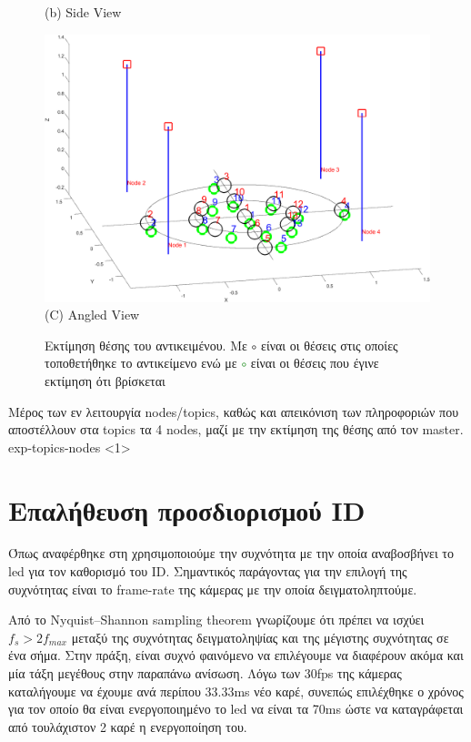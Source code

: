 \begin{figure} [H]
\begin{minipage}{.5\textwidth}
      {(b) Side View}
	  \end{minipage}
  \begin{minipage}{\textwidth}
    \centering
    \includegraphics[width=.8\linewidth]{../Images/Experiments-Results/nodes-pos-with-est-angle.png}\\
    {(C) Angled View}
  \end{minipage}
    \hfill \break
    \decoRule
    \caption[Εκτίμηση θέσης του αντικειμένου.]{Εκτίμηση θέσης του αντικειμένου. Με \textcolor{black}{\LARGE$\circ$} είναι οι θέσεις στις οποίες τοποθετήθηκε το αντικείμενο ενώ με \textcolor{green}{\LARGE$\circ$} είναι οι θέσεις που έγινε εκτίμηση ότι βρίσκεται} %
    \label{fig:multi-exp-pos-estimations}
\end{figure}

{Μέρος των εν λειτουργία nodes/topics, καθώς και απεικόνιση των πληροφοριών που αποστέλλουν στα topics τα 4 nodes, μαζί με την εκτίμηση της θέσης από τον master.}%
{exp-topics-nodes}%
<1>

\section{Επαλήθευση προσδιορισμού ID}
Όπως αναφέρθηκε στη  χρησιμοποιούμε την συχνότητα με την οποία αναβοσβήνει το led για τον καθορισμό του ID. Σημαντικός παράγοντας για την επιλογή της συχνότητας είναι το frame-rate της κάμερας με την οποία δειγματοληπτούμε. 

Από το Nyquist–Shannon sampling theorem γνωρίζουμε ότι πρέπει να ισχύει $f_s > 2f_{max}$ μεταξύ της συχνότητας δειγματοληψίας και της μέγιστης συχνότητας σε ένα σήμα. Στην πράξη, είναι συχνό φαινόμενο να επιλέγουμε να διαφέρουν ακόμα και μία τάξη μεγέθους στην παραπάνω ανίσωση. Λόγω των 30fps της κάμερας καταλήγουμε να έχουμε ανά περίπου 33.33ms νέο καρέ, συνεπώς επιλέχθηκε ο χρόνος για τον οποίο θα είναι ενεργοποιημένο το led να είναι τα 70ms ώστε να καταγράφεται από τουλάχιστον 2 καρέ η ενεργοποίηση του. 

